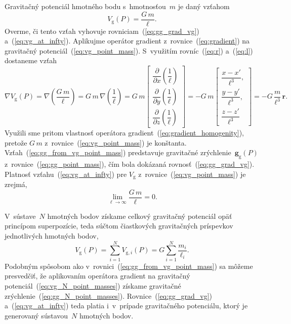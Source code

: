 \documentclass[a4paper, 12pt]{book}
\newcommand{\gidx}{\mathrm g}
\let\vec\mathbf
\begin{document}
Gravitačný potenciál hmotného bodu s~hmotnosťou~$m$ je daný vzťahom
%
\begin{equation}
\label{eq:vg_point_mass}
V_\gidx(P) = \frac{G \, m}{\ell}{.}
\end{equation}
%
Overme, či tento vzťah vyhovuje rovniciam~(\ref{eq:gg_grad_vg}) 
a~(\ref{eq:vg_at_infty}).  Aplikujme operátor gradient 
z~rovnice~(\ref{eq:gradient}) na gravitačný potenciál~(\ref{eq:vg_point_mass}).  
S~využitím rovníc~(\ref{eq:r}) a~(\ref{eq:l}) dostaneme vzťah
%
\begin{equation}
\label{eq:gg_from_vg_point_mass}
\nabla V_\gidx(P) = \nabla \left( \frac{G \, m}{\ell} \right) = G \, m \, 
\nabla \left( \frac{1}{\ell} \right) =
%
G \, m
%
\begin{bmatrix}
\dfrac{\partial}{\partial x} \left( \dfrac{1}{\ell} \right)\\[2ex]
\dfrac{\partial}{\partial y} \left( \dfrac{1}{\ell} \right)\\[2ex]
\dfrac{\partial}{\partial z} \left( \dfrac{1}{\ell} \right)
\end{bmatrix}
%
=
%
-G \, m
%
\begin{bmatrix}
\dfrac{x - x'}{\ell^3}{,}\\[2ex]
\dfrac{y - y'}{\ell^3}{,}\\[2ex]
\dfrac{z - z'}{\ell^3}
\end{bmatrix}
%
=
%
-G \, \frac{m}{\ell^3} \, \vec{r}{.}
\end{equation}
%
Využili sme pritom vlastnosť operátora gradient~(\ref{eq:gradient_homogenity}), 
pretože $G \, m$ z~rovnice~(\ref{eq:vg_point_mass}) je konštanta.  
Vzťah~(\ref{eq:gg_from_vg_point_mass}) predstavuje gravitačné zrýchlenie~$\vec 
g_\gidx(P)$ z~rovnice~(\ref{eq:gg_point_mass}), čím bola dokázaná 
rovnosť~(\ref{eq:gg_grad_vg}).  Platnosť vzťahu~(\ref{eq:vg_at_infty}) pre 
$V_\gidx$ z~rovnice~(\ref{eq:vg_point_mass}) je zrejmá,
%
\begin{equation}
\lim_{\ell \to \infty} \frac{G \, m}{\ell} = 0{.}
\end{equation}

V~sústave~$N$ hmotných bodov získame celkový gravitačný potenciál opäť 
princípom superpozície, teda súčtom čiastkových gravitačných príspevkov 
jednotlivých hmotných bodov,
%
\begin{equation}
\label{eq:vg_N_point_masses}
V_\gidx(P) = \sum_{i = 1}^{N} V_{\gidx,i}(P) = G \sum_{i = 1}^{N}\frac{
m_i}{\ell_i}{.}
\end{equation}
%
Podobným spôsobom ako v~rovnici~(\ref{eq:gg_from_vg_point_mass}) sa môžeme 
presvedčiť, že aplikovaním operátora gradient na gravitačný 
potenciál~(\ref{eq:vg_N_point_masses}) získame gravitačné 
zrýchlenie~(\ref{eq:gg_N_point_masses}).  Rovnice~(\ref{eq:gg_grad_vg}) 
a~(\ref{eq:vg_at_infty}) teda platia i~v~prípade gravitačného potenciálu, ktorý 
je generovaný sústavou~$N$ hmotných bodov.
\end{document}
